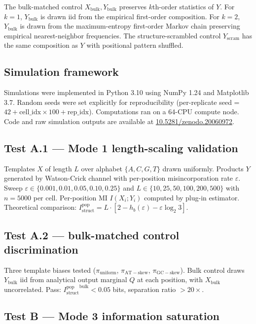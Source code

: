 \documentclass[aps,prx,reprint,amsmath,amssymb,floatfix,superscriptaddress,nofootinbib]{revtex4-2}
\newcommand{\zenodoDOI}{\href{https://doi.org/10.5281/zenodo.20060972}{10.5281/zenodo.20060972}}
\theoremstyle{plain-thm}
\theoremstyle{definition-thm}
\newcommand{\Istructpop}{I_{\mathrm{struct}}^{\mathrm{pop}}}
\newcommand{\Hbin}{h_b}
\begin{document}
The bulk-matched control $X_{\mathrm{bulk}}, Y_{\mathrm{bulk}}$ preserves $k$th-order statistics of $Y$. For $k = 1$, $Y_{\mathrm{bulk}}$ is drawn iid from the empirical first-order composition. For $k = 2$, $Y_{\mathrm{bulk}}$ is drawn from the maximum-entropy first-order Markov chain preserving empirical nearest-neighbor frequencies. The structure-scrambled control $Y_{\mathrm{scram}}$ has the same composition as $Y$ with positional pattern shuffled.

\subsection{Simulation framework}

Simulations were implemented in Python 3.10 using NumPy 1.24 and Matplotlib 3.7. Random seeds were set explicitly for reproducibility (per-replicate seed = $42 + \mathrm{cell\_idx} \times 100 + \mathrm{rep\_idx}$). Computations ran on a 64-CPU compute node. Code and raw simulation outputs are available at \zenodoDOI{}.

\subsection{Test A.1 --- Mode 1 length-scaling validation}

Templates $X$ of length $L$ over alphabet $\{A, C, G, T\}$ drawn uniformly. Products $Y$ generated by Watson-Crick channel with per-position misincorporation rate $\varepsilon$. Sweep $\varepsilon \in \{0.001, 0.01, 0.05, 0.10, 0.25\}$ and $L \in \{10, 25, 50, 100, 200, 500\}$ with $n = 5000$ per cell. Per-position MI $I(X_i; Y_i)$ computed by plug-in estimator. Theoretical comparison: $\Istructpop = L \cdot \left[2 - \Hbin(\varepsilon) - \varepsilon \log_2 3\right]$.

\subsection{Test A.2 --- bulk-matched control discrimination}

Three template biases tested ($\pi_{\mathrm{uniform}}$, $\pi_{\mathrm{AT-skew}}$, $\pi_{\mathrm{GC-skew}}$). Bulk control draws $Y_{\mathrm{bulk}}$ iid from analytical output marginal $Q$ at each position, with $X_{\mathrm{bulk}}$ uncorrelated. Pass: ${\Istructpop}^{\mathrm{bulk}} < 0.05$ bits, separation ratio $> 20\times$.

\subsection{Test B --- Mode 3 information saturation}
\end{document}
